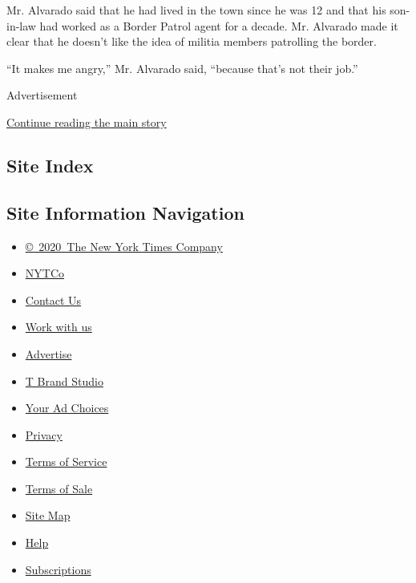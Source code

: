 Mr. Alvarado said that he had lived in the town since he was 12 and that
his son-in-law had worked as a Border Patrol agent for a decade. Mr.
Alvarado made it clear that he doesn't like the idea of militia members
patrolling the border.

``It makes me angry,'' Mr. Alvarado said, ``because that's not their
job.''

Advertisement

\protect\hyperlink{after-bottom}{Continue reading the main story}

\hypertarget{site-index}{%
\subsection{Site Index}\label{site-index}}

\hypertarget{site-information-navigation}{%
\subsection{Site Information
Navigation}\label{site-information-navigation}}

\begin{itemize}
\tightlist
\item
  \href{https://help.nytimes3xbfgragh.onion/hc/en-us/articles/115014792127-Copyright-notice}{©~2020~The
  New York Times Company}
\end{itemize}

\begin{itemize}
\tightlist
\item
  \href{https://www.nytco.com/}{NYTCo}
\item
  \href{https://help.nytimes3xbfgragh.onion/hc/en-us/articles/115015385887-Contact-Us}{Contact
  Us}
\item
  \href{https://www.nytco.com/careers/}{Work with us}
\item
  \href{https://nytmediakit.com/}{Advertise}
\item
  \href{http://www.tbrandstudio.com/}{T Brand Studio}
\item
  \href{https://www.nytimes3xbfgragh.onion/privacy/cookie-policy\#how-do-i-manage-trackers}{Your
  Ad Choices}
\item
  \href{https://www.nytimes3xbfgragh.onion/privacy}{Privacy}
\item
  \href{https://help.nytimes3xbfgragh.onion/hc/en-us/articles/115014893428-Terms-of-service}{Terms
  of Service}
\item
  \href{https://help.nytimes3xbfgragh.onion/hc/en-us/articles/115014893968-Terms-of-sale}{Terms
  of Sale}
\item
  \href{https://spiderbites.nytimes3xbfgragh.onion}{Site Map}
\item
  \href{https://help.nytimes3xbfgragh.onion/hc/en-us}{Help}
\item
  \href{https://www.nytimes3xbfgragh.onion/subscription?campaignId=37WXW}{Subscriptions}
\end{itemize}
